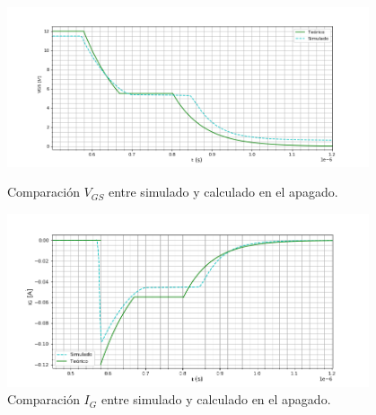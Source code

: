 \begin{figure}[H]
	\centering
	\begin{minipage}{0.45\textwidth}
		\centering
		\includegraphics[width=0.95\textwidth]{ImagenesEjercicio-1/sim_apagado_gate} %
		\caption{Comparación $V_{GS}$ entre simulado y calculado en el apagado.}
		\label{ej1:fig:sim_apagado_gate}
	\end{minipage}\hfill
	\begin{minipage}{0.45\textwidth}
		\centering
		\includegraphics[width=0.95\textwidth]{ImagenesEjercicio-1/sim_apagado_gate_i} %
		\caption{Comparación $I_{G}$ entre simulado y calculado en el apagado.}
		\label{ej1:fig:sim_apagado_gate_i}
	\end{minipage}
\end{figure}
